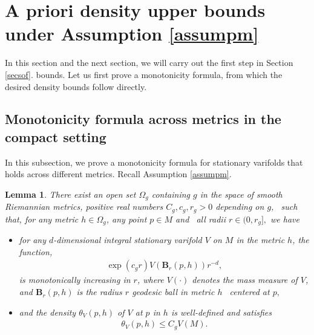 \documentclass[11pt,a4paper]{amsart}
\numberwithin{equation}{section}
\newcommand{\Om}{\Omega}
\newcommand{\ta}{\theta}
\newcommand{\br}{\mathbf{B}_r}
\theoremstyle{plain}
\newtheorem{lem}{Lemma}[subsection]
\theoremstyle{definition}
\numberwithin{equation}{subsection}
\begin{document}
	\section{A priori density upper bounds under Assumption \ref{assumpm}}\label{secmon}
	In this section and the next section, we will carry out the first step in Section \ref{secsof}. bounds. Let us first prove a monotonicity formula, from which the desired density bounds follow directly.\subsection{Monotonicity formula across metrics in the compact setting}\label{ssmon}
In this subsection, we prove a monotonicity formula for stationary varifolds that holds across different metrics. Recall Assumption \ref{assumpm}. 
\begin{lem}\label{lemmon}
	There exist an open set $\Om_g$ containing $g$ in the space of smooth Riemannian metrics, positive real numbers $C_g,c_g,r_g>0$ depending on $g$,  such that, for any metric $h\in \Om_g$, any point $p\in M$ and  all radii $r\in(0,r_g],$ we have	\begin{itemize}
		\item for any $d$-dimensional integral stationary varifold $V$ on $M$ in the metric $h$, the function,
		\begin{align*}
			\exp(c_gr)V(\br(p,h))r^{-d},
		\end{align*} is monotonically increasing in $r$, where $V(\cdot)$ denotes the mass measure of $V$, and $\br(p,h)$ is the radius $r$ geodesic ball in metric $h$  centered at $p,$
		\item and the density $\ta_V({p,h})$ of $V$ at $p$ in $h$ is well-defined and satisfies
		\begin{align*}
			\ta_V({p,h})\le C_g V(M).
		\end{align*}
	\end{itemize}
\end{lem}
\end{document}
